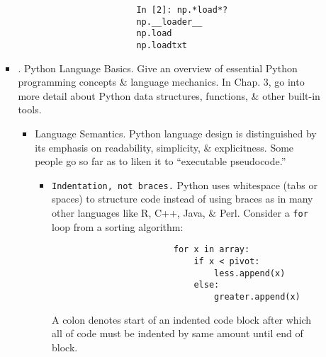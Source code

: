 \documentclass{article}
\begin{document}
\begin{enumerate}
\begin{itemize}
\begin{itemize}
\begin{itemize}
\begin{verbatim}
					In [2]: np.*load*?
					np.__loader__
					np.load
					np.loadtxt
				\end{verbatim}
			\end{itemize}
			\item {. Python Language Basics.} Give an overview of essential Python programming concepts \& language mechanics. In Chap. 3, go into more detail about Python data structures, functions, \& other built-in tools.
			\begin{itemize}
				\item {\sf Language Semantics.} Python language design is distinguished by its emphasis on readability, simplicity, \& explicitness. Some people go so far as to liken it to ``executable pseudocode.''
				\begin{itemize}
					\item {\tt Indentation, not braces.} Python uses whitespace (tabs or spaces) to structure code instead of using braces as in many other languages like R, C++, Java, \& Perl. Consider a {\tt for} loop from a sorting algorithm:
					\begin{verbatim}
						for x in array:
						    if x < pivot:
						        less.append(x)
						    else:
						        greater.append(x)
					\end{verbatim}
					A colon denotes start of an indented code block after which all of code must be indented by same amount until end of block.
					

\end{itemize}
\end{itemize}
\end{itemize}
\end{itemize}
\end{enumerate}
\end{document}
